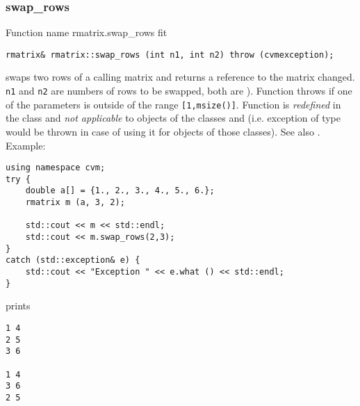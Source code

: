 \subsubsection{swap\_rows}
Function%
\pdfdest name {rmatrix.swap_rows} fit
\begin{verbatim}
rmatrix& rmatrix::swap_rows (int n1, int n2) throw (cvmexception);
\end{verbatim}
swaps two rows of a calling matrix and returns a reference to
the matrix changed. \verb"n1" and \verb"n2" are
 numbers of rows to be swapped,
both are \Based).
Function throws  
if one of the parameters is outside of the range
\verb"[1,msize()]".
Function is \emph{redefined} in  the class
 and
\emph{not applicable} to objects of the classes
 and
 (i.e. exception of
type  would be thrown
in case of using it for objects of those classes).
See also .
Example:
\begin{Verbatim}
using namespace cvm;
try {
    double a[] = {1., 2., 3., 4., 5., 6.};
    rmatrix m (a, 3, 2);

    std::cout << m << std::endl;
    std::cout << m.swap_rows(2,3);
}
catch (std::exception& e) {
    std::cout << "Exception " << e.what () << std::endl;
}
\end{Verbatim}
prints
\begin{Verbatim}
1 4
2 5
3 6

1 4
3 6
2 5
\end{Verbatim}
\newpage





